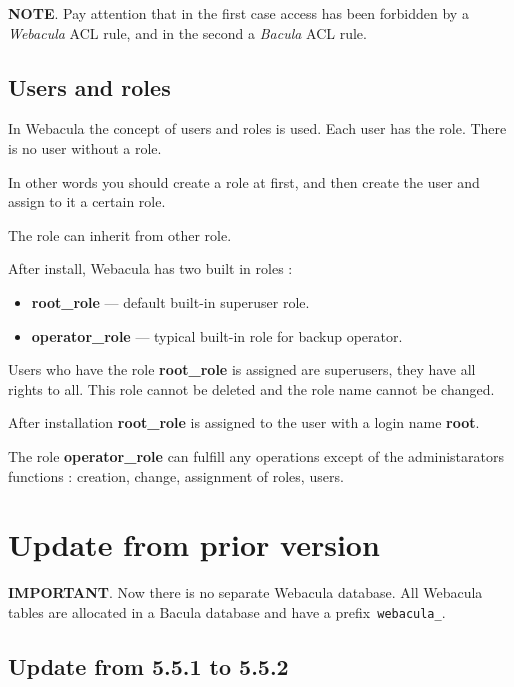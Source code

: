 \documentclass[10pt]{article}
\begin{document}
\textbf{NOTE}.
Pay attention that in the first case access has been forbidden by a \textit{Webacula} ACL rule,
and in the second a \textit{Bacula} ACL rule.


\subsection{Users and roles}
\label{Setup:Users and roles}

In Webacula the concept of users and roles is used.
Each user has the role. There is no user without a role.

In other words you should create a role at first, and then create the user and assign to it a certain role.

The role can inherit from other role.

After install, Webacula has two built in roles :

\begin{itemize}
  \item \textbf{root\_role} --- default built-in superuser role.
  \item \textbf{operator\_role} --- typical built-in role for backup operator.
\end{itemize}

Users who have the role \textbf{root\_role} is assigned are superusers, they have all rights to all.
This role cannot be deleted and the role name cannot be changed.

After installation \textbf{root\_role} is assigned to the user with a login name \textbf{root}.

The role \textbf{operator\_role} can fulfill any operations except of the administarators functions :
creation, change, assignment of roles, users.



\section{Update from prior version}
\label{Update}

\textbf{IMPORTANT}. Now there is no separate Webacula database.
All Webacula tables are allocated in a Bacula database and have a prefix\texttt{ webacula\_}.


\subsection{Update from 5.5.1 to 5.5.2}
\label{Update: from 5.5.1 to 5.5.2}
\end{document}
